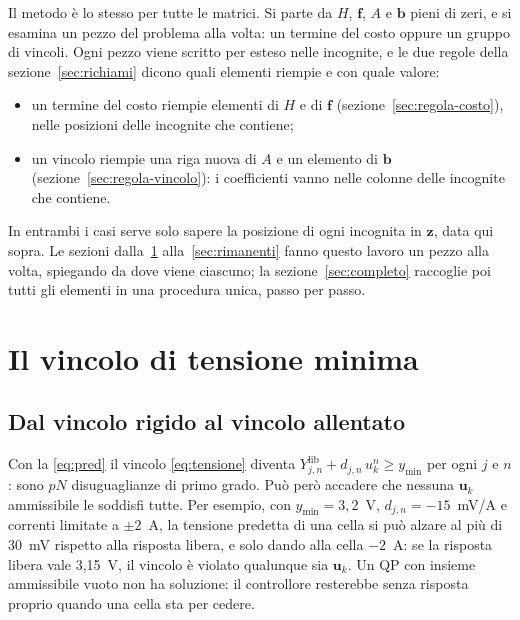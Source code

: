 \documentclass[11pt,a4paper]{article}
\newcommand{\vett}[1]{\boldsymbol{#1}}      %
\newcommand{\lib}{\mathrm{lib}}             %
\begin{document}
Il metodo è lo stesso per tutte le matrici. Si parte da $H$, $\vett{f}$, $A$ e $\vett{b}$
pieni di zeri, e si esamina un pezzo del problema alla volta: un termine del
costo oppure un gruppo di vincoli. Ogni pezzo viene scritto per esteso nelle
incognite, e le due regole della sezione~\ref{sec:richiami} dicono quali
elementi riempie e con quale valore:
\begin{itemize}
  \item un termine del costo riempie elementi di $H$ e di $\vett{f}$
        (sezione~\ref{sec:regola-costo}), nelle posizioni delle incognite che
        contiene;
  \item un vincolo riempie una riga nuova di $A$ e un elemento di $\vett{b}$
        (sezione~\ref{sec:regola-vincolo}): i coefficienti vanno nelle colonne
        delle incognite che contiene.
\end{itemize}
In entrambi i casi serve solo sapere la posizione di ogni incognita in $\vett{z}$,
data qui sopra. Le sezioni dalla~\ref{sec:vincolo-tensione}
alla~\ref{sec:rimanenti} fanno questo lavoro un pezzo alla volta, spiegando
da dove viene ciascuno; la sezione~\ref{sec:completo} raccoglie poi tutti gli
elementi in una procedura unica, passo per passo.

\section{Il vincolo di tensione minima}\label{sec:vincolo-tensione}

\subsection{Dal vincolo rigido al vincolo allentato}

Con la \eqref{eq:pred} il vincolo \eqref{eq:tensione} diventa
$Y^\lib_{j,n} + d_{j,n}\,u^n_k \ge y_{\min}$ per ogni $j$ e $n$: sono $pN$
disuguaglianze di primo grado. Può però accadere che nessuna $\vett{u}_k$ ammissibile le
soddisfi tutte. Per esempio, con $y_{\min} = 3{,}2$~V, $d_{j,n} = -15$~mV/A e
correnti limitate a $\pm 2$~A, la tensione predetta di una cella si può alzare
al più di 30~mV rispetto alla risposta libera, e solo dando alla cella $-2$~A:
se la risposta libera vale 3,15~V, il vincolo è violato qualunque sia $\vett{u}_k$. Un
QP con insieme ammissibile vuoto non ha soluzione: il controllore resterebbe
senza risposta proprio quando una cella sta per cedere.
\end{document}
